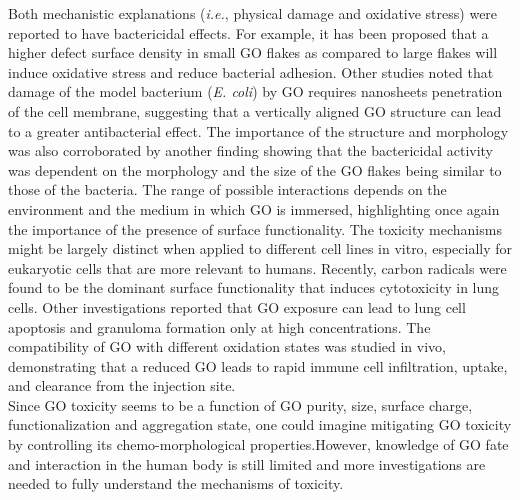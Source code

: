 Both mechanistic explanations (\textit{i.e.}, physical damage and oxidative stress) were reported 
to have bactericidal effects. For example, it has been proposed that a higher defect surface density in small GO flakes as compared to large flakes will induce oxidative stress and reduce bacterial adhesion. Other studies noted that damage of the model bacterium (\textit{E. coli}) by GO requires nanosheets penetration of the cell membrane, suggesting that a vertically aligned GO structure can lead to a greater antibacterial effect.\cite{lu2017enhanced} The importance of the structure and morphology was also corroborated by another finding showing that the bactericidal activity was dependent on  the morphology and the size of the GO flakes being similar to those of the bacteria.\cite{buccheri2016modification} The range of possible interactions depends on the environment and the medium in which GO is immersed, highlighting once again the importance of the presence of surface functionality.\cite{zhang2016mitigation}
The toxicity mechanisms might be largely distinct when applied to different cell lines in vitro, especially for eukaryotic cells that are more relevant to humans. Recently, carbon radicals were found to be the dominant surface functionality that induces cytotoxicity in lung cells.\cite{li2018surface} Other investigations reported that GO exposure can lead to lung cell apoptosis and granuloma formation only at high concentrations.\cite{chang2011vitro} The compatibility of GO with different oxidation states was studied in vivo, demonstrating that a reduced GO leads to rapid immune cell infiltration, uptake, and clearance from the injection site. \cite{sydlik2015vivo}\\
Since GO toxicity seems to be a function of GO purity, size, surface charge, functionalization and aggregation state, one could imagine mitigating GO toxicity by controlling its chemo-morphological properties.\cite{zhang2016mitigation}However, knowledge of GO fate and interaction in the human body is still limited and more investigations are needed to fully understand the mechanisms of toxicity.



